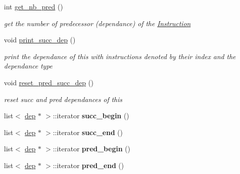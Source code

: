 \begin{DoxyCompactItemize}
\mbox{\label{class_instruction_a9e56e8e2c857abc409f27af9f80f9595}} 
int \mbox{\hyperlink{class_instruction_a9e56e8e2c857abc409f27af9f80f9595}{get\+\_\+nb\+\_\+pred}} ()
\begin{DoxyCompactList}\small\item\em get the number of predecessor (dependance) of the \mbox{\hyperlink{class_instruction}{Instruction}} \end{DoxyCompactList}\item 
\mbox{\label{class_instruction_af489e680ae3c69fd12b0a23e959172e5}} 
void \mbox{\hyperlink{class_instruction_af489e680ae3c69fd12b0a23e959172e5}{print\+\_\+succ\+\_\+dep}} ()
\begin{DoxyCompactList}\small\item\em print the dependance of this with instructions denoted by their index and the dependance type \end{DoxyCompactList}\item 
\mbox{\label{class_instruction_a786e43bcd16d16a4db7c8a665c4d68af}} 
void \mbox{\hyperlink{class_instruction_a786e43bcd16d16a4db7c8a665c4d68af}{reset\+\_\+pred\+\_\+succ\+\_\+dep}} ()
\begin{DoxyCompactList}\small\item\em reset succ and pred dependances of this \end{DoxyCompactList}\item 
\mbox{\label{class_instruction_a2c6f13ddda889e4e2b8b69897de6b733}} 
list$<$ \mbox{\hyperlink{structdep}{dep}} $\ast$ $>$\+::iterator {\bfseries succ\+\_\+begin} ()
\item 
\mbox{\label{class_instruction_a0800ca0afbbc783b57170d981d406fb6}} 
list$<$ \mbox{\hyperlink{structdep}{dep}} $\ast$ $>$\+::iterator {\bfseries succ\+\_\+end} ()
\item 
\mbox{\label{class_instruction_a300e014a1136068872d235d3e41d5376}} 
list$<$ \mbox{\hyperlink{structdep}{dep}} $\ast$ $>$\+::iterator {\bfseries pred\+\_\+begin} ()
\item 
\mbox{\label{class_instruction_a0c14cd69b30373678261f8aa0da029ab}} 
list$<$ \mbox{\hyperlink{structdep}{dep}} $\ast$ $>$\+::iterator {\bfseries pred\+\_\+end} ()

\end{DoxyCompactItemize}
